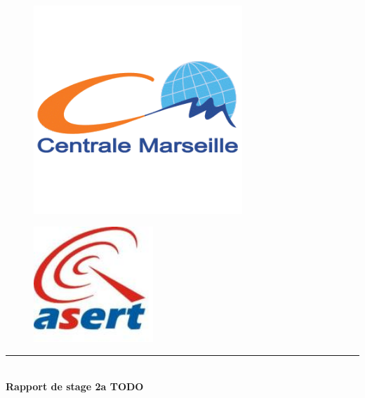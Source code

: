 \begin{titlepage}
\begin{center}

\begin{figure}[ht]
  \begin{minipage}[b]{0.5\linewidth}
    \centering
    \includegraphics[width=0.7\textwidth]{img/logo_ecm}
    \label{logo_ecm}
  \end{minipage}
  \hspace{0.5cm}
  \begin{minipage}[t]{0.5\linewidth}
    \vspace{-4cm}
    \begin{center}
    \includegraphics[width=0.4\textwidth]{img/logo_asert}
    \end{center}
    \label{logo_asert}
  \end{minipage}
\end{figure}



\vspace{2cm}
\hrule  ~\\[0.4cm]
{ \huge \bfseries Rapport de stage 2a TODO}\\[0.4cm]


\end{center}
\end{titlepage}
